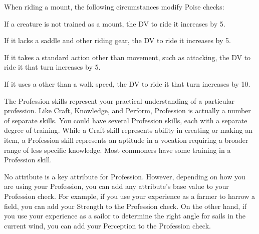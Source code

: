     When riding a mount, the following circumstances modify Poise checks:
    \begin{raggeditemize}
      \item If a creature is not trained as a mount, the DV to ride it increases by 5.
      \item If it lacks a saddle and other riding gear, the DV to ride it increases by 5.
      \item If it takes a standard action other than movement, such as attacking, the DV to ride it that turn increases by 5.
      \item If it uses a  other than a walk speed, the DV to ride it that turn increases by 10.
    \end{raggeditemize}


\newpage
{}
  The Profession skills represent your practical understanding of a particular profession.
  Like Craft, Knowledge, and Perform, Profession is actually a number of separate skills.
  You could have several Profession skills, each with a separate degree of training.
  While a Craft skill represents ability in creating or making an item, a Profession skill represents an aptitude in a vocation requiring a broader range of less specific knowledge.
  Most commoners have some training in a Profession skill.

  No attribute is a key attribute for Profession.
  However, depending on how you are using your Profession, you can add any attribute's base value to your Profession check.
  For example, if you use your experience as a farmer to harrow a field, you can add your Strength to the Profession check.
  On the other hand, if you use your experience as a sailor to determine the right angle for sails in the current wind, you can add your Perception to the Profession check.

